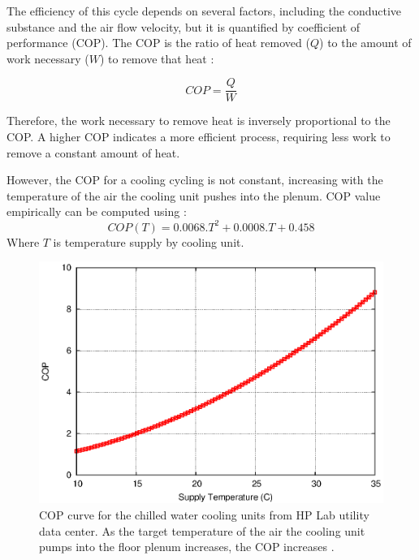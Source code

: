 \documentclass[conference]{IEEEtran}
\begin{document}
The efficiency of this cycle depends on several factors, including the conductive substance and the air flow velocity, but it is quantified by coefficient of performance (COP).
The COP is the ratio of heat removed ($Q$) to the amount of work necessary ($W$) to remove that heat  \cite{moore2005making}:

\begin{equation}\label{eqn:cop}
	COP=\frac{Q}{W}
\end{equation}

Therefore, the work necessary to remove heat is inversely proportional to the COP.  
A higher COP indicates a more efficient process, requiring less work to remove a constant amount of heat.

However, the COP for a cooling cycling is not constant, increasing with the temperature of the air the cooling unit pushes into the plenum.  
COP value empirically can be computed using \cite{moore2005making}:
\begin{equation}\label{eqn:copt}
	COP(T) = 0.0068.T^2 + 0.0008.T + 0.458
\end{equation}
Where $T$ is temperature supply by cooling unit.  

\begin{figure}[thp!]
\begin{center}
\includegraphics[scale=0.6]{graphs/cop.eps}
\end{center}
\caption{COP curve for the chilled water cooling units from HP Lab utility data center.
As the target temperature of the air the cooling unit pumps into the floor plenum increases, the COP increases \cite{moore2005making}.}
\label{fig:twotier}
\end{figure} 
\end{document}
